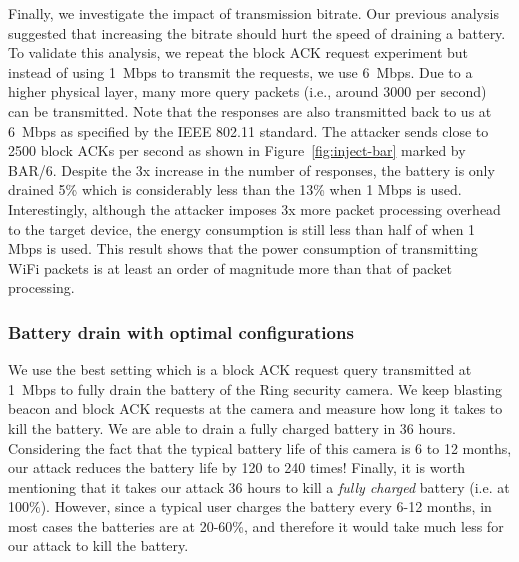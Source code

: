 Finally, we investigate the impact of transmission bitrate.
Our previous analysis suggested that increasing the bitrate should hurt the speed of draining a battery. 
To validate this analysis, we repeat the block ACK request experiment but instead of using 1~Mbps to transmit the requests, we use 6~Mbps. Due to a higher physical layer, many more query packets (i.e., around 3000 per second) can be transmitted. Note that the responses are also transmitted back to us at 6~Mbps as specified by the IEEE 802.11 standard.
The attacker sends close to 2500 block ACKs per second as shown in Figure~\ref{fig:inject-bar} marked by BAR/6.
Despite the 3x increase in the number of responses, the battery is only drained 5\% which is considerably less than the 13\% when 1 Mbps is used.
Interestingly, although the attacker imposes 3x more packet processing overhead to the target device, the energy consumption is still less than half of when 1 Mbps is used. This result shows that the power consumption of transmitting WiFi packets is at least an order of magnitude more than that of packet processing.

\subsubsection{Battery drain with optimal configurations}
We use the best setting which is a block ACK request query transmitted at 1~Mbps to fully drain the battery of the Ring security camera.
We keep blasting beacon and block ACK requests at the camera and measure how long it takes to kill the battery. We are able to drain a fully charged battery in 36 hours. Considering the fact that the typical battery life of this camera is 6 to 12 months, our attack reduces the battery life by 120 to 240 times! Finally, it is worth mentioning that it takes our attack 36 hours to kill a \textit{fully charged} battery (i.e. at 100\%). However, since a typical user charges the battery every 6-12 months, in most cases the batteries are at 20-60\%, and therefore it would take much less for our attack to kill the battery. 



